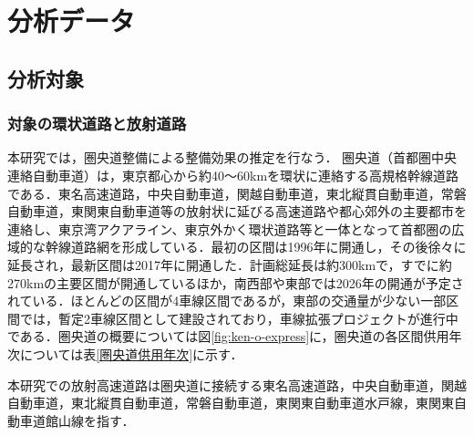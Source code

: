 \chapter{分析データ}

\section{分析対象}
\subsection{対象の環状道路と放射道路}
本研究では，圏央道整備による整備効果の推定を行なう．
圏央道（首都圏中央連絡自動車道）は，東京都心から約40〜60kmを環状に連絡する高規格幹線道路である．東名高速道路，中央自動車道，関越自動車道，東北縦貫自動車道，常磐自動車道，東関東自動車道等の放射状に延びる高速道路や都心郊外の主要都市を連絡し、東京湾アクアライン、東京外かく環状道路等と一体となって首都圏の広域的な幹線道路網を形成している\cite{kokudo2024}．最初の区間は1996年に開通し，その後徐々に延長され，最新区間は2017年に開通した．計画総延長は約300kmで，すでに約270kmの主要区間が開通しているほか，南西部や東部では2026年の開通が予定されている．ほとんどの区間が4車線区間であるが，東部の交通量が少ない一部区間では，暫定2車線区間として建設されており，車線拡張プロジェクトが進行中である．圏央道の概要については図\ref{fig:ken-o-express}に，圏央道の各区間供用年次については表\ref{圏央道供用年次}に示す．

本研究での放射高速道路は圏央道に接続する東名高速道路，中央自動車道，関越自動車道，東北縦貫自動車道，常磐自動車道，東関東自動車道水戸線，東関東自動車道館山線を指す．

